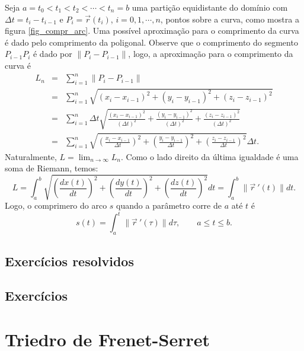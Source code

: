 Seja $a=t_0<t_1<t_2<\cdots<t_n=b $ uma partição equidistante do domínio com $\Delta t=t_i-t_{i-1}$ e $P_i=\vec{r}(t_i)$, $i=0,1,\cdots,n$, pontos sobre a curva, como mostra a figura \ref{fig_compr_arc}. Uma possível aproximação para o comprimento da curva é dado pelo comprimento da poligonal. Observe que o comprimento do segmento $P_{i-1}P_i$ é dado por $\|P_i-P_{i-1}\|$, logo, a aproximação para o comprimento da curva é
\begin{eqnarray*}
L_n&=&\sum_{i=1}^n\|P_i-P_{i-1}\|\\
&=&\sum_{i=1}^n \sqrt{(x_i-x_{i-1})^2+(y_i-y_{i-1})^2+(z_i-z_{i-1})^2}\\
&=&\sum_{i=1}^n \Delta t \sqrt{\frac{(x_i-x_{i-1})^2}{(\Delta t) ^2}+\frac{(y_i-y_{i-1})^2}{(\Delta t) ^2}+\frac{(z_i-z_{i-1})^2}{(\Delta t) ^2}}\\
&=&\sum_{i=1}^n \sqrt{\left(\frac{x_i-x_{i-1}}{\Delta t }\right)^2+\left(\frac{y_i-y_{i-1}}{\Delta t}\right)^2+\left(\frac{z_i-z_{i-1}}{\Delta t}\right)^2}\Delta t.
\end{eqnarray*}
Naturalmente, $L=\lim_{n\to\infty }L_n$. Como o lado direito da última igualdade é uma soma de Riemann, temos:
\begin{equation}\label{defcomparco}
L=\int_{a}^{b} \sqrt{\left(\frac{dx(t)}{dt}\right)^2+\left(\frac{dy(t)}{dt}\right)^2+\left(\frac{dz(t)}{dt}\right)^2}dt=\int_{a}^{b}\|\vec{r}\!~'(t)\|dt.
\end{equation}
Logo, o comprimero do arco $s$ quando a parâmetro corre de $a$ até $t$ é
\begin{equation}\label{defcomparco_1}
s(t)=\int_{a}^{t}\|\vec{r}\!~'(\tau)\|d\tau,\qquad a\leq t\leq b.
\end{equation}

\subsection*{Exercícios resolvidos}

\construirExeresol


\subsection*{Exercícios}

\construirExer



\section{Triedro de Frenet-Serret}

